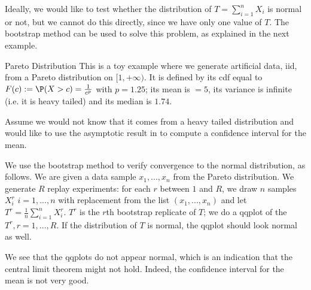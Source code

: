Ideally, we would like to test whether the
distribution of $T=\sum_{i=1}^{n} X_i$ is normal
or not, but we cannot do this directly, since we
have only one value of $T$. The bootstrap method
can be used to solve this problem, as explained
in the next example.


\begin{figure}\center
\end{figure}

\begin{ex}{Pareto Distribution}  This is a toy example where we generate
artificial data, iid, from a Pareto
distribution on $[1,+\infty)$. It is defined by
its cdf equal to $F(c):=\P(X >
c)=\frac{1}{c^{p}}$ with $p=1.25$; its mean is
$=5$, its variance is infinite (i.e. it is heavy
tailed) and its median is $1.74$.

Assume we would not know that it comes from a
heavy tailed distribution and would like to use
the asymptotic result in  to
compute a confidence interval for the mean.

We use the bootstrap method to verify convergence
to the normal distribution, as follows. We are
given a data sample $x_1, ...,x_n$ from the
Pareto distribution. We generate $R$ replay
experiments: for each $r$ between $1$ and $R$, we
draw $n$ samples $X^r_i$ $i=1,...,n$ with
replacement from the list $(x_1, ..., x_n)$ and
let $T^r=\frac1n\sum_{i=1}^{n}X^r_i$. $T^r$ is the $r$th
bootstrap replicate of $T$; we do a qqplot of the
$T^r, r=1,...,R$. If the distribution of $T$ is
normal, the qqplot should look normal as well.

We see that the qqplots do not appear normal,
which is an indication that the central limit
theorem might not hold. Indeed, the confidence
interval for the mean is not very good.
\end{ex}



